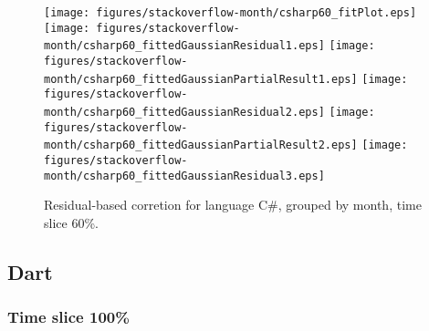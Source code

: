 \begin{figure}[hb]
\centering
{}
{\texttt{[image: figures/stackoverflow-month/csharp60\_fitPlot.eps]}}
{\texttt{[image: figures/stackoverflow-month/csharp60\_fittedGaussianResidual1.eps]}}
{\texttt{[image: figures/stackoverflow-month/csharp60\_fittedGaussianPartialResult1.eps]}}
{\texttt{[image: figures/stackoverflow-month/csharp60\_fittedGaussianResidual2.eps]}}
{\texttt{[image: figures/stackoverflow-month/csharp60\_fittedGaussianPartialResult2.eps]}}
{\texttt{[image: figures/stackoverflow-month/csharp60\_fittedGaussianResidual3.eps]}}
\caption{Residual-based corretion for language C\#, grouped by month, time slice 60\%.}
\end{figure}


\clearpage 
\newpage 


\subsection{Dart}

\FloatBarrier

\subsubsection{Time slice 100\%}

